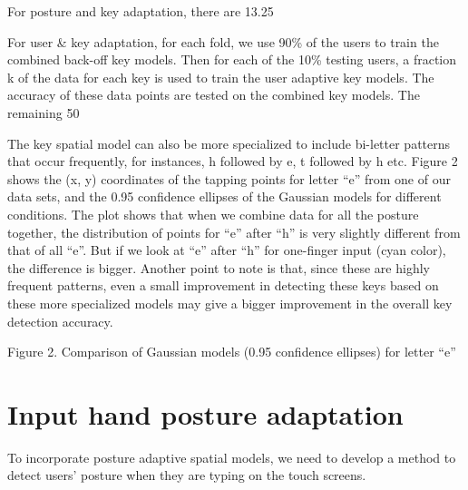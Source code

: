 \documentclass{sigchi}
\begin{document}
For posture and key adaptation, there are 13.25%

For user & key adaptation, for each fold, we use 90\% of the users to train the
combined back-off key models. Then for each of the 10\% testing users,  a
fraction k of the data for each key is used to train the user adaptive key models. The accuracy of these data points are tested on the combined key models. The remaining 50%

The key spatial model can also be more specialized to include bi-letter patterns that occur frequently, for instances, h followed by e, t followed by h etc. Figure 2 shows the (x, y) coordinates of the tapping points for letter “e” from one of our data sets, and the 0.95 confidence ellipses of the Gaussian models for different conditions. The plot shows that when we combine data for all the posture together, the distribution of points for “e” after “h” is very slightly different from that of all “e”. But if we look at “e” after “h” for one-finger input (cyan color), the difference is bigger. Another point to note is that, since these are highly frequent patterns, even a small improvement in detecting these keys based on these more specialized models may give a bigger improvement in the overall key detection accuracy. 


Figure 2. Comparison of Gaussian models (0.95 confidence ellipses) for letter “e”

\section{Input hand posture adaptation}
To incorporate posture adaptive spatial models, we need to develop a method to
detect users' posture when they are typing on the touch screens. 
\end{document}
